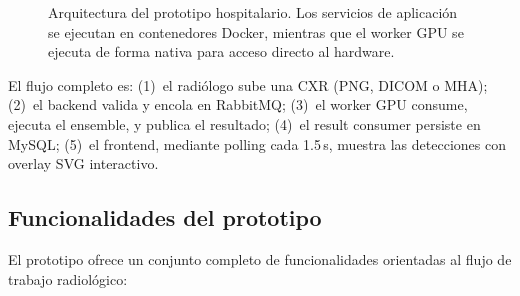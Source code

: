 \documentclass[conference]{IEEEtran}
\begin{document}
\begin{figure}[t]
\centering
{}
\caption{Arquitectura del prototipo hospitalario. Los servicios de
aplicaci\'{o}n se ejecutan en contenedores Docker, mientras que el worker GPU
se ejecuta de forma nativa para acceso directo al hardware.}
\label{fig:arquitectura}
\end{figure}

El flujo completo es: (1)~el radi\'{o}logo sube una CXR (PNG, DICOM o MHA);
(2)~el backend valida y encola en RabbitMQ; (3)~el worker GPU consume,
ejecuta el ensemble, y publica el resultado; (4)~el result consumer persiste
en MySQL; (5)~el frontend, mediante polling cada 1.5\,s, muestra las
detecciones con overlay SVG interactivo.


\subsection{Funcionalidades del prototipo}

El prototipo ofrece un conjunto completo de funcionalidades orientadas al
flujo de trabajo radiol\'{o}gico:
\end{document}
